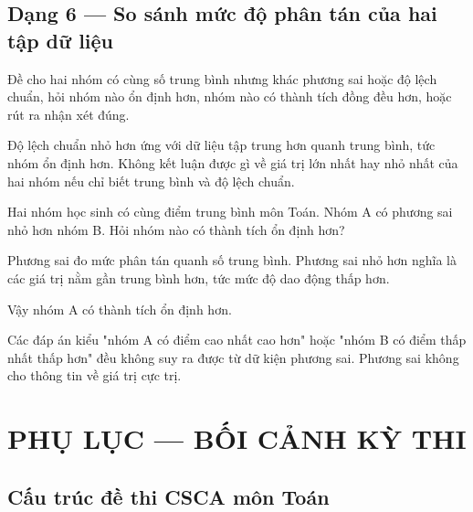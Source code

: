 \documentclass[11pt, a4paper]{article}
\begin{document}
\subsection{Dạng 6 — So sánh mức độ phân tán của hai tập dữ liệu}

 Đề cho hai nhóm có cùng số trung bình nhưng khác phương sai hoặc độ lệch chuẩn, hỏi nhóm nào ổn định hơn, nhóm nào có thành tích đồng đều hơn, hoặc rút ra nhận xét đúng.

 Độ lệch chuẩn nhỏ hơn ứng với dữ liệu tập trung hơn quanh trung bình, tức nhóm ổn định hơn. Không kết luận được gì về giá trị lớn nhất hay nhỏ nhất của hai nhóm nếu chỉ biết trung bình và độ lệch chuẩn.

\begin{vidu}[{6}]
Hai nhóm học sinh có cùng điểm trung bình môn Toán. Nhóm A có phương sai nhỏ hơn nhóm B. Hỏi nhóm nào có thành tích ổn định hơn?

Phương sai đo mức phân tán quanh số trung bình. Phương sai nhỏ hơn nghĩa là các giá trị nằm gần trung bình hơn, tức mức độ dao động thấp hơn.

Vậy nhóm A có thành tích ổn định hơn.

 Các đáp án kiểu "nhóm A có điểm cao nhất cao hơn" hoặc "nhóm B có điểm thấp nhất thấp hơn" đều không suy ra được từ dữ kiện phương sai. Phương sai không cho thông tin về giá trị cực trị.

\end{vidu}
\section{PHỤ LỤC — BỐI CẢNH KỲ THI}

\subsection{Cấu trúc đề thi CSCA môn Toán}

\end{document}
